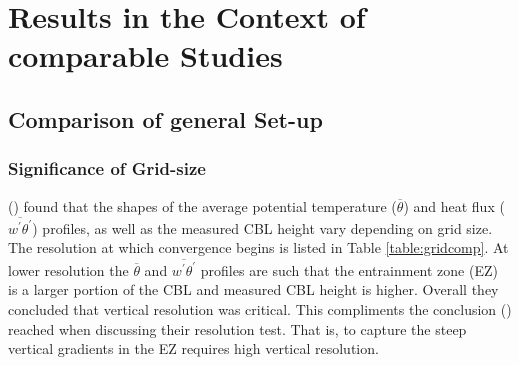 
\chapter{Results in the Context of comparable Studies}
\label{ch:results}
\setlength{\parindent}{0cm}

\section{Comparison of general Set-up}
\FloatBarrier

\subsection{Significance of Grid-size}

\citeauthor{SullPat} (\citeyear{SullPat}) found that the shapes of the average potential temperature ($\overline{\theta}$) and heat flux ($\overline{w^{'}\theta^{'}}$) profiles, as well as the measured \acs{CBL} height vary depending on grid size.  The resolution at which convergence begins is listed in Table \ref{table:gridcomp}.  At lower resolution the $\overline{\theta}$ and $\overline{w^{'}\theta^{'}}$ profiles are such that the entrainment zone (\acs{EZ}) is a larger portion of the \acs{CBL} and measured \acs{CBL} height is higher.  Overall they concluded that vertical resolution was critical.  This compliments the conclusion \citeauthor{BrooksFowler2} (\citeyear{BrooksFowler2}) reached when discussing their resolution test.  That is, to capture the steep vertical gradients in the \acs{EZ} requires high vertical resolution. \\

